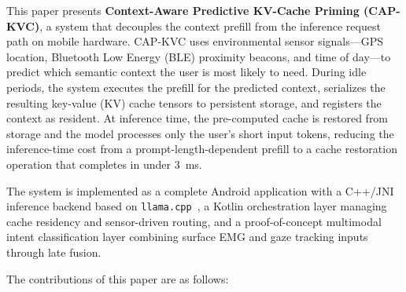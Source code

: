 \documentclass[journal]{IEEEtran}
\begin{document}
This paper presents \textbf{Context-Aware Predictive KV-Cache Priming (CAP-KVC)}, a system that decouples the context prefill from the inference request path on mobile hardware. CAP-KVC uses environmental sensor signals---GPS location, Bluetooth Low Energy (BLE) proximity beacons, and time of day---to predict which semantic context the user is most likely to need. During idle periods, the system executes the prefill for the predicted context, serializes the resulting key-value (KV) cache tensors to persistent storage, and registers the context as resident. At inference time, the pre-computed cache is restored from storage and the model processes only the user's short input tokens, reducing the inference-time cost from a prompt-length-dependent prefill to a cache restoration operation that completes in under 3~ms.

The system is implemented as a complete Android application with a C++/JNI inference backend based on \texttt{llama.cpp}~\cite{llamacpp}, a Kotlin orchestration layer managing cache residency and sensor-driven routing, and a proof-of-concept multimodal intent classification layer combining surface EMG and gaze tracking inputs through late fusion.

The contributions of this paper are as follows:
\end{document}
